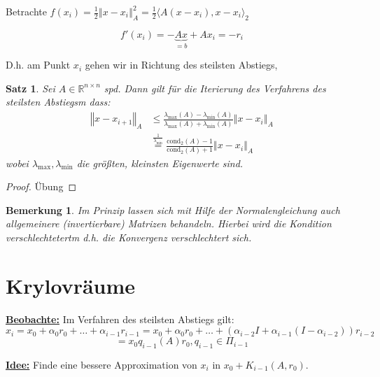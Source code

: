 \documentclass{book}
\newtheorem{theorem}[algorithm]{Satz}
\newtheorem{remark}[algorithm]{Bemerkung}
\def\R{\mathbb{R}}
\def\cond{\text{cond}}
\begin{document}
            Betrachte $f(x_i)=\frac{1}{2}\left\Vert x-x_i \right\Vert_A^2 = \frac{1}{2} \langle A(x-x_i),x-x_i \rangle_2$

            \[
                f'(x_i)=-\underbrace{Ax}_{=b}+Ax_i=-r_i    
            \]

            D.h. am Punkt $x_i$ gehen wir in Richtung des steilsten Abstiegs,

            \begin{theorem}\label{s3.7}
                Sei $A\in\R^{n\times n}$ spd. Dann gilt für die Iterierung des Verfahrens des steilsten Abstiegsm dass:
                \begin{align*}
                    \left\Vert x-x_{i+1} \right\Vert_A &\leq \frac{\lambda_{\max}(A)-\lambda_{\min}(A)}{\lambda_{\max}(A)+\lambda_{\min}(A)} \left\Vert x-x_i \right\Vert_A\\
                    &\stackrel{\frac{1}{\lambda_{\min}}}{=}\frac{\cond_2(A)-1}{\cond_2(A)+1}\left\Vert x-x_i \right\Vert_A
                \end{align*}
                wobei $\lambda_{\max},\lambda_{\min}$ die größten, kleinsten Eigenwerte sind.
            \end{theorem}

            \begin{proof}
                Übung %
            \end{proof}

            \begin{remark}\label{b3.8}
                Im Prinzip lassen sich mit Hilfe der Normalengleichung auch allgemeinere (invertierbare) Matrizen behandeln. 
                Hierbei wird die Kondition verschlechtetertm d.h. die Konvergenz verschlechtert sich.
            \end{remark}

        \section{Krylovräume}

            \underline{\textbf{Beobachte:}} Im Verfahren des steilsten Abstiegs gilt:
            \[
                x_i=x_0+\alpha_0r_0+\dots+\alpha_{i-1}r_{i-1} = x_0+\alpha_0r_0+\dots+(\alpha_{i-2}I+\alpha_{i-1}(I-\alpha_{i-2}))r_{i-2}
            \]
            \[=x_0 q_{i-1}(A)r_0, q_{i-1}\in\Pi_{i-1}\]

            \underline{\textbf{Idee:}} Finde eine bessere Approximation von $x_i$ in $x_0+K_{i-1}(A,r_0)$.
\end{document}
